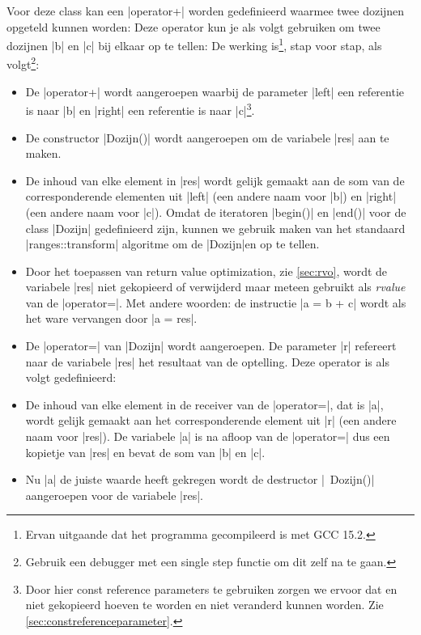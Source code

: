 \begin{cpplstShortInline}
Voor deze class kan een |operator+| worden gedefinieerd waarmee twee dozijnen opgeteld kunnen worden:
Deze operator kun je als volgt gebruiken om twee dozijnen |b| en |c| bij elkaar op te tellen:
De werking is\footnote{%
	Ervan uitgaande dat het programma gecompileerd is met GCC 15.2.
}, stap voor stap, als volgt\footnote{%
	Gebruik een debugger met een single step functie om dit zelf na te gaan.
}: 
\begin{itemize}
	\item 
	De |operator+| wordt aangeroepen waarbij de parameter |left| een referentie is naar |b| en |right| een referentie is naar |c|\footnote{%
		Door hier const reference parameters te gebruiken zorgen we ervoor dat  en  niet gekopieerd hoeven te worden en niet veranderd kunnen worden. Zie \cref{sec:constreferenceparameter}. 
	}.
	\item 
	De constructor |Dozijn()| wordt aangeroepen om de variabele |res| aan te maken.
	\item 
	De inhoud van elke element in |res| wordt gelijk gemaakt aan de som van de corresponderende elementen uit |left| (een andere naam voor |b|) en |right| (een andere naam voor |c|).
	Omdat de iteratoren |begin()| en |end()| voor de class |Dozijn| gedefinieerd zijn, kunnen we gebruik maken van het standaard |ranges::transform| algoritme om de |Dozijn|en op te tellen.
	\item
	Door het toepassen van return value optimization, zie \cref{sec:rvo}, wordt de variabele |res| niet gekopieerd of verwijderd maar meteen gebruikt als \emph{rvalue} van de |operator=|.
	Met andere woorden: de instructie |a = b + c| wordt als het ware vervangen door |a = res|.
	\item 
	De |operator=| van |Dozijn| wordt aangeroepen. De parameter |r| refereert naar de variabele |res| het resultaat van de optelling.
	Deze operator is als volgt gedefinieerd:
	\item 
	De inhoud van elke element in de receiver van de |operator=|, dat is |a|, wordt gelijk gemaakt aan het corresponderende element uit |r| (een andere naam voor |res|).
	De variabele |a| is na afloop van de |operator=| dus een kopietje van |res| en bevat de som van |b| en |c|.
	\item 
	Nu |a| de juiste waarde heeft gekregen wordt de destructor |~Dozijn()| aangeroepen voor de variabele |res|.

\end{itemize}
\end{cpplstShortInline}
